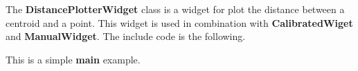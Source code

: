 The \textbf{DistancePlotterWidget} class is a widget for plot the
distance between a centroid and a point. This widget is used in
combination with \textbf{CalibratedWiget} and \textbf{ManualWidget}. The
include code is the following.

\begin{Shaded}
\begin{Highlighting}[]
 
\end{Highlighting}
\end{Shaded}

This is a simple \textbf{main} example.

